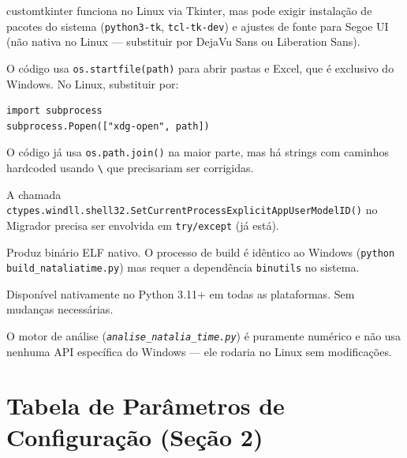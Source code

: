 \documentclass[12pt,a4paper]{report}
\newcommand{\code}[1]{\texttt{#1}}
\newcommand{\arquivo}[1]{\texttt{\itshape #1}}
\begin{document}
\begin{description}[leftmargin=2.5em, style=nextline]
  \item[\textbf{GUI}]
    customtkinter funciona no Linux via Tkinter, mas pode exigir instalação
    de pacotes do sistema (\code{python3-tk}, \code{tcl-tk-dev}) e ajustes
    de fonte para Segoe UI (não nativa no Linux — substituir por DejaVu Sans
    ou Liberation Sans).

  \item[\textbf{Abertura de arquivos}]
    O código usa \code{os.startfile(path)} para abrir pastas e Excel, que é
    exclusivo do Windows. No Linux, substituir por:
    \begin{lstlisting}[caption={Substituição de os.startfile() para Linux}]
import subprocess
subprocess.Popen(["xdg-open", path])
    \end{lstlisting}

  \item[\textbf{Separador de caminhos}]
    O código já usa \code{os.path.join()} na maior parte, mas há
    strings com caminhos hardcoded usando \texttt{\textbackslash} que
    precisariam ser corrigidas.

  \item[\textbf{Ícone e título da janela}]
    A chamada \code{ctypes.windll.shell32.SetCurrentProcessExplicitAppUserModelID()}
    no Migrador precisa ser envolvida em \code{try/except} (já está).

  \item[\textbf{PyInstaller no Linux}]
    Produz binário ELF nativo. O processo de build é idêntico ao Windows
    (\code{python build\_nataliatime.py}) mas requer a dependência
    \code{binutils} no sistema.

  \item[\textbf{tomllib}]
    Disponível nativamente no Python 3.11+ em todas as plataformas. Sem
    mudanças necessárias.
\end{description}

O motor de análise (\arquivo{analise\_natalia\_time.py}) é puramente
numérico e não usa nenhuma API específica do Windows — ele rodaria no Linux
sem modificações.


\appendix
\chapter{Tabela de Parâmetros de Configuração (Seção 2)}
\label{ap:config}
\end{document}
